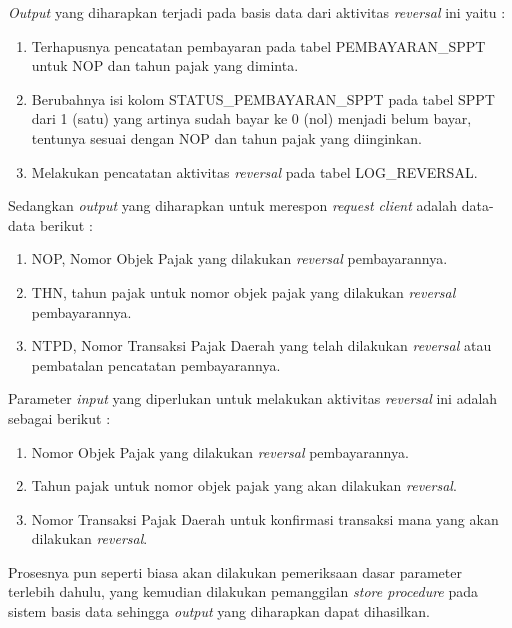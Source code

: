 \documentclass[pdftex,12pt, oneside]{article}
\begin{document}
\textit{Output} yang diharapkan terjadi pada basis data dari aktivitas \textit{reversal} ini yaitu :

\begin{enumerate}[1.]
  \item Terhapusnya pencatatan pembayaran pada tabel PEMBAYARAN\_SPPT untuk NOP dan tahun pajak yang diminta.
  \item Berubahnya isi kolom STATUS\_PEMBAYARAN\_SPPT pada tabel SPPT dari 1 (satu) yang artinya sudah bayar ke 0 (nol) menjadi belum bayar, tentunya sesuai dengan NOP dan tahun pajak yang diinginkan.
  \item Melakukan pencatatan aktivitas \textit{reversal} pada tabel LOG\_REVERSAL.
\end{enumerate}

Sedangkan \textit{output} yang diharapkan untuk merespon \textit{request client} adalah data-data berikut :

\begin{enumerate}[1.]
  \item NOP, Nomor Objek Pajak yang dilakukan \textit{reversal} pembayarannya.
  \item THN, tahun pajak untuk nomor objek pajak yang dilakukan \textit{reversal} pembayarannya.
  \item NTPD, Nomor Transaksi Pajak Daerah yang telah dilakukan \textit{reversal} atau pembatalan pencatatan pembayarannya.
\end{enumerate}

Parameter \textit{input} yang diperlukan untuk melakukan aktivitas \textit{reversal} ini adalah sebagai berikut :

\begin{enumerate}[1.]
  \item Nomor Objek Pajak yang dilakukan \textit{reversal} pembayarannya.
  \item Tahun pajak untuk nomor objek pajak yang akan dilakukan \textit{reversal}.
  \item Nomor Transaksi Pajak Daerah untuk konfirmasi transaksi mana yang akan dilakukan \textit{reversal}.
\end{enumerate}

Prosesnya pun seperti biasa akan dilakukan pemeriksaan dasar parameter terlebih dahulu, yang kemudian dilakukan pemanggilan \textit{store procedure} pada sistem basis data sehingga \textit{output} yang diharapkan dapat dihasilkan.
\end{document}
